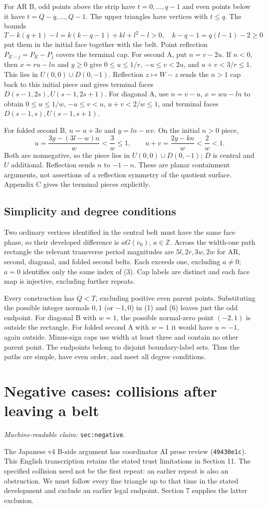 \documentclass[11pt]{amsart}
\newcommand{\Z}{\mathbb Z}
\newcommand{\record}[1]{\nolinkurl{#1}}
\newcommand{\claimid}[1]{\par\nopagebreak\noindent\textit{Machine-readable claim:} \record{#1}.\par}
\begin{document}
For AR B, odd points above the strip have $t=0,\ldots,q-1$ and even
points below it have $t=Q-q,\ldots,Q-1$. The upper triangles have
vertices with $t\le q$. The bounds
\[
 T-k(q+1)-l=k(k-q-1)+kl+l^2-l>0,\quad
 k-q-1=q(l-1)-2\ge0
\]
put them in the initial face together with the belt. Point reflection
$P_{E-j}=P_E-P_j$ covers the terminal cap.
For second A, put $n=v-2u$. If $n<0$, then $x=ru-ln$ and $y\ge0$
give $0\le u\le1/r$, $-u\le v<2u$, and $u+v<3/r\le1$.
This lies in $U(0,0)\cup D(0,-1)$. Reflection $z\mapsto W-z$ sends
the $n>1$ cap back to this initial piece and gives terminal faces
$D(s-1,2s),U(s-1,2s+1)$.
For diagonal A, use $n=v-u$, $x=wu-ln$ to obtain
$0\le u\le1/w$, $-u\le v<u$, $u+v<2/w\le1$, and terminal faces
$D(s-1,s),U(s-1,s+1)$.

For folded second B, $n=u+3v$ and $y=ln-wv$. On the initial $n>0$
piece,
\[
 u=\frac{3y-(3l-w)n}{w}<\frac3w\le1,\qquad
 u+v=\frac{2y-kn}{w}<\frac2w<1.
\]
Both are nonnegative, so the piece lies in $U(0,0)\cup D(0,-1)$;
$D$ is central and $U$ additional. Reflection sends $n$ to $-1-n$.
These are planar containment arguments, not assertions of a reflection
symmetry of the quotient surface. Appendix C gives the terminal pieces
explicitly.

\subsection{Simplicity and degree conditions}
Two ordinary vertices identified in the central belt must have the
same face phase, so their developed difference is $aG(v_0)$,
$a\in\Z$. Across the width-one path rectangle the relevant transverse
period magnitudes are $5l,2r,3w,2w$ for AR, second, diagonal, and folded
second belts. Each exceeds one, excluding $a\ne0$; $a=0$ identifies
only the same index of (3). Cap labels are distinct and each face map
is injective, excluding further repeats.

Every construction has $Q<T$, excluding positive even parent points.
Substituting the possible integer normals $0,1$ (or $-1,0$) in (1)
and (6) leaves just the odd endpoint. For diagonal B with $w=1$, the
possible normal-zero point $(-2,1)$ is outside the rectangle. For
folded second A with $w=1$ it would have $u=-1$, again outside.
Minus-sign caps use width at least three and contain no other parent
point. The endpoints belong to disjoint boundary-label sets. Thus the
paths are simple, have even order, and meet all degree conditions.

\section{Negative cases: collisions after leaving a belt}\label{sec:negative}
\claimid{sec:negative}
The Japanese v4 B-side argument has coordinator AI prose review
(\record{49430e1c}). This English transcription retains the stated trust
limitations in Section 11.
The specified collision need not be the first repeat: an earlier
repeat is also an obstruction. We must follow every fine triangle up
to that time in the stated development and exclude an earlier legal
endpoint. Section 7 supplies the latter exclusion.
\end{document}
